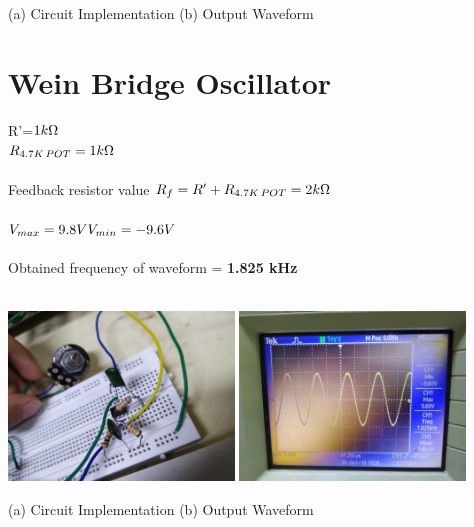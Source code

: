 \documentclass[12pt]{report}
\begin{document}
\begin{center}
    (a) Circuit Implementation\hspace{3cm} (b) Output Waveform
\end{center}

\vspace{5cm}


\section{Wein Bridge Oscillator}
\large \textsf{R'=$1 k\ohm$}  \\ 
\large \textsf{$R_{4.7K\, POT} = 1 k\ohm$} \\ \\
\large \textsf{Feedback resistor value $ R_f=R'+R_{4.7K\, POT} = 2k\ohm$ } \\ \\
\large \textsf{$V_{max} = 9.8V \\ 
\large {V_{min} =-9.6V} $}\\ \\
\large \textsf{Obtained frequency of waveform} = \textbf{1.825 kHz} \\ \\ 

\vspace{6pt}
\begin{center}
\includegraphics[width=0.45\textwidth]{figs/wb_cd.jpeg}\hspace{8pt}
\includegraphics[width=0.45\textwidth]{figs/wb_oscc.jpeg}
\end{center}

\begin{center}
    (a) Circuit Implementation\hspace{3cm} (b) Output Waveform
\end{center}
\vspace{5cm}
\end{document}
